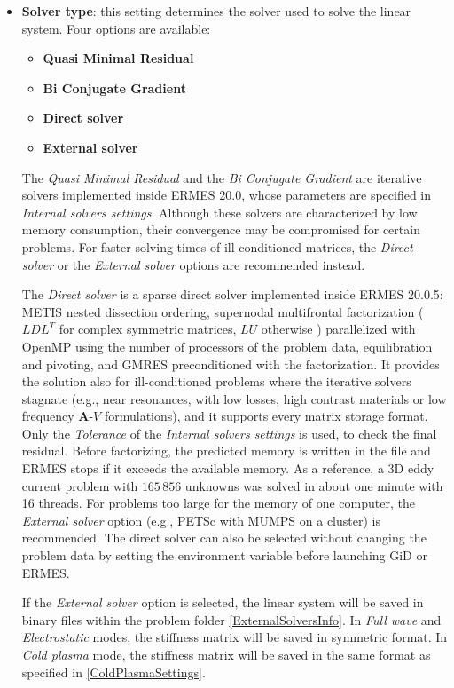 \begin{itemize}\itemsep0.5em 
	\item \textbf{Solver type}: this setting determines the solver used to solve the linear system. Four options are available:
	\begin{itemize}\itemsep0.25em 
	    \item \textbf{Quasi Minimal Residual}
	    \item \textbf{Bi Conjugate Gradient}
	    \item \textbf{Direct solver}
	    \item \textbf{External solver}
    \end{itemize}
    The \textit{Quasi Minimal Residual} and the \emph{Bi Conjugate Gradient} are iterative solvers implemented inside ERMES 20.0, whose parameters are specified in \emph{Internal solvers settings}. Although these solvers are characterized by low memory consumption, their convergence may be compromised for certain problems. For faster solving times of ill-conditioned matrices, the \emph{Direct solver} or the \emph{External solver} options are recommended instead. 
    
    The \emph{Direct solver} is a sparse direct solver implemented inside ERMES 20.0.5: METIS nested dissection ordering, supernodal multifrontal factorization ( $LDL^T$ for complex symmetric matrices, $LU$ otherwise ) parallelized with OpenMP using the number of processors of the problem data, equilibration and pivoting, and GMRES preconditioned with the factorization. It provides the solution also for ill-conditioned problems where the iterative solvers stagnate (e.g., near resonances, with low losses, high contrast materials or low frequency $\mathbf{A}$-$V$ formulations), and it supports every matrix storage format. Only the \emph{Tolerance} of the \emph{Internal solvers settings} is used, to check the final residual. Before factorizing, the predicted memory is written in the  file and ERMES stops if it exceeds the available memory. As a reference, a 3D eddy current problem with $165\,856$ unknowns was solved in about one minute with 16 threads. For problems too large for the memory of one computer, the \emph{External solver} option (e.g., PETSc with MUMPS on a cluster) is recommended. The direct solver can also be selected without changing the problem data by setting the environment variable  before launching GiD or ERMES.
    
    If the \emph{External solver} option is selected, the linear system will be saved in binary files within the problem folder \ref{ExternalSolversInfo}. In \textit{Full wave} and \textit{Electrostatic} modes, the stiffness matrix will be saved in symmetric format. In \textit{Cold plasma} mode, the stiffness matrix will be saved in the same format as specified in \ref{ColdPlasmaSettings}. 
    

\end{itemize}
